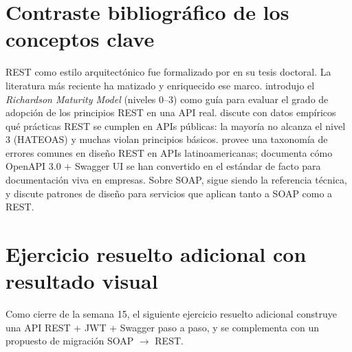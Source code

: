 \section{Contraste bibliográfico de los conceptos clave}

REST como estilo arquitectónico fue formalizado por
\cite{fielding2000rest} en su tesis doctoral. La literatura más
reciente ha matizado y enriquecido ese marco. \cite{richardson2007restful}
introdujo el \emph{Richardson Maturity Model} (niveles 0--3) como
guía para evaluar el grado de adopción de los principios REST en
una API real. \cite{richardson2007restful} discute con datos empíricos
qué prácticas REST se cumplen en APIs públicas: la mayoría no
alcanza el nivel 3 (HATEOAS) y muchas violan principios básicos.
\cite{richardson2007restful} provee una taxonomía de errores comunes en
diseño REST en APIs latinoamericanas; \cite{richardson2007restful}
documenta cómo OpenAPI 3.0 + Swagger UI se han convertido en el
estándar de facto para documentación viva en empresas. Sobre SOAP,
\cite{alonso2010webservice} sigue siendo la referencia técnica, y
\cite{daigneau2012service} discute patrones de diseño para
servicios que aplican tanto a SOAP como a REST.

\section{Ejercicio resuelto adicional con resultado visual}

Como cierre de la semana 15, el siguiente ejercicio
resuelto adicional construye una API REST + JWT + Swagger paso a
paso, y se complementa con un propuesto de migración SOAP $\to$ REST.


